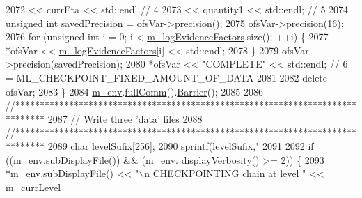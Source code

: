 \begin{DoxyCode}
2072             << currEta                   << std::endl  \textcolor{comment}{// 4}
2073             << quantity1                 << std::endl; \textcolor{comment}{// 5}
2074     \textcolor{keywordtype}{unsigned} \textcolor{keywordtype}{int} savedPrecision = ofsVar->precision();
2075     ofsVar->precision(16);
2076     \textcolor{keywordflow}{for} (\textcolor{keywordtype}{unsigned} \textcolor{keywordtype}{int} i = 0; i < \hyperlink{class_q_u_e_s_o_1_1_m_l_sampling_a75f2ceab4a2c6774b3fa07d74221dbf3}{m\_logEvidenceFactors}.size(); ++i) \{
2077       *ofsVar << \hyperlink{class_q_u_e_s_o_1_1_m_l_sampling_a75f2ceab4a2c6774b3fa07d74221dbf3}{m\_logEvidenceFactors}[i] << std::endl;
2078     \}
2079     ofsVar->precision(savedPrecision);
2080     *ofsVar << \textcolor{stringliteral}{"COMPLETE"}                << std::endl; \textcolor{comment}{// 6 = ML\_CHECKPOINT\_FIXED\_AMOUNT\_OF\_DATA}
2081 
2082     \textcolor{keyword}{delete} ofsVar;
2083   \}
2084   \hyperlink{class_q_u_e_s_o_1_1_m_l_sampling_a13f1ca4fe9f94822fe572a743eaced1d}{m\_env}.\hyperlink{class_q_u_e_s_o_1_1_base_environment_a0b0779b41ff304058856e97e1d16b4d4}{fullComm}().\hyperlink{class_q_u_e_s_o_1_1_mpi_comm_a4059971c30e023b272fccaa6aa00c426}{Barrier}();
2085 
2086   \textcolor{comment}{//******************************************************************************}
2087   \textcolor{comment}{// Write three 'data' files}
2088   \textcolor{comment}{//******************************************************************************}
2089   \textcolor{keywordtype}{char} levelSufix[256];
2090   sprintf(levelSufix,\textcolor{stringliteral}{"%
2091 
2092   \textcolor{keywordflow}{if} ((\hyperlink{class_q_u_e_s_o_1_1_m_l_sampling_a13f1ca4fe9f94822fe572a743eaced1d}{m\_env}.\hyperlink{class_q_u_e_s_o_1_1_base_environment_a8a0064746ae8dddfece4229b9ad374d6}{subDisplayFile}()) && (\hyperlink{class_q_u_e_s_o_1_1_m_l_sampling_a13f1ca4fe9f94822fe572a743eaced1d}{m\_env}.
      \hyperlink{class_q_u_e_s_o_1_1_base_environment_a1fe5f244fc0316a0ab3e37463f108b96}{displayVerbosity}() >= 2)) \{
2093     *\hyperlink{class_q_u_e_s_o_1_1_m_l_sampling_a13f1ca4fe9f94822fe572a743eaced1d}{m\_env}.\hyperlink{class_q_u_e_s_o_1_1_base_environment_a8a0064746ae8dddfece4229b9ad374d6}{subDisplayFile}() << \textcolor{stringliteral}{"\(\backslash\)n CHECKPOINTING chain at level "} << 
      \hyperlink{class_q_u_e_s_o_1_1_m_l_sampling_af9416874c856e50f3b35270e801f17e4}{m\_currLevel}
}
\end{DoxyCode}
